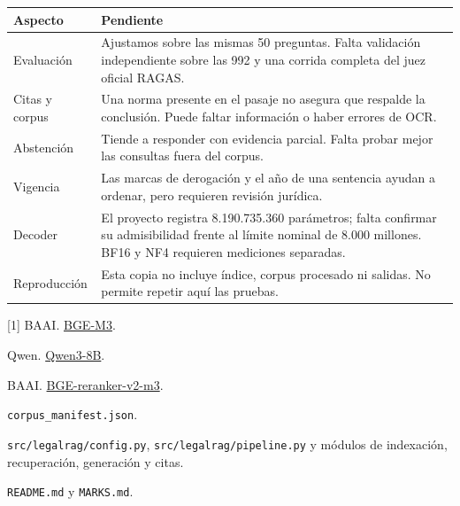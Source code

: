 \documentclass[10pt,a4paper]{article}
\newcommand{\seccion}[1]{\vspace{5pt}{\large\bfseries\color{accent}#1}\par\vspace{2pt}}
\newcommand{\archivo}[1]{\nolinkurl{#1}}
\begin{document}
\seccion{4. Limitaciones}
\begin{tabularx}{\linewidth}{@{}L{3cm}Y@{}}
\toprule
\textbf{Aspecto} & \textbf{Pendiente}\\
\midrule
Evaluación & Ajustamos sobre las mismas 50 preguntas. Falta validación independiente sobre las 992 y una corrida completa del juez oficial RAGAS.\\
Citas y corpus & Una norma presente en el pasaje no asegura que respalde la conclusión. Puede faltar información o haber errores de OCR.\\
Abstención & Tiende a responder con evidencia parcial. Falta probar mejor las consultas fuera del corpus.\\
Vigencia & Las marcas de derogación y el año de una sentencia ayudan a ordenar, pero requieren revisión jurídica.\\
Decoder & El proyecto registra 8.190.735.360 parámetros; falta confirmar su admisibilidad frente al límite nominal de 8.000 millones. BF16 y NF4 requieren mediciones separadas.\\
Reproducción & Esta copia no incluye índice, corpus procesado ni salidas. No permite repetir aquí las pruebas.\\
\bottomrule
\end{tabularx}

\seccion{Fuentes}
{\footnotesize
[1] BAAI. \href{https://huggingface.co/BAAI/bge-m3}{BGE-M3}.\par
[2] Qwen. \href{https://huggingface.co/Qwen/Qwen3-8B}{Qwen3-8B}.\par
[3] BAAI. \href{https://huggingface.co/BAAI/bge-reranker-v2-m3}{BGE-reranker-v2-m3}.\par
[4] \archivo{corpus_manifest.json}.\par
[5] \archivo{src/legalrag/config.py}, \archivo{src/legalrag/pipeline.py} y módulos de indexación, recuperación, generación y citas.\par
[6] \archivo{README.md} y \archivo{MARKS.md}.\par
}
\end{document}
